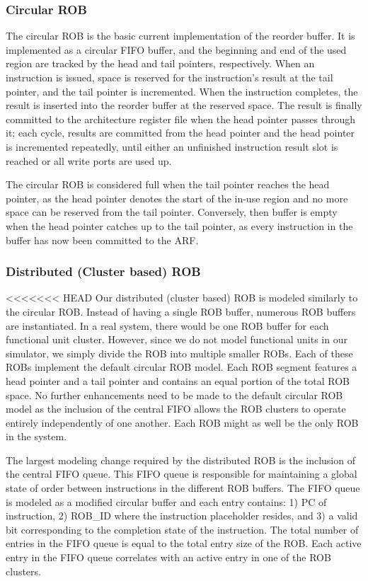 \documentclass{acm_proc_article-sp}
\begin{document}
\subsubsection{Circular ROB}
\label{sec:circ}
The circular ROB is the basic current implementation of the reorder buffer. It is implemented as a circular FIFO buffer, and the beginning and end of the used region are tracked by the head and tail pointers, respectively. When an instruction is issued, space is reserved for the instruction's result at the tail pointer, and the tail pointer is incremented. When the instruction completes, the result is inserted into the reorder buffer at the reserved space. The result is finally committed to the architecture register file when the head pointer passes through it; each cycle, results are committed from the head pointer and the head pointer is incremented repeatedly, until either an unfinished instruction result slot is reached or all write ports are used up.

The circular ROB is considered full when the tail pointer reaches the head pointer, as the head pointer denotes the start of the in-use region and no more space can be reserved from the tail pointer. Conversely, then buffer is empty when the head pointer catches up to the tail pointer, as every instruction in the buffer has now been committed to the ARF.

\subsubsection{Distributed (Cluster based) ROB}
<<<<<<< HEAD
Our distributed (cluster based) ROB is modeled similarly to the circular ROB.  Instead of having a single ROB buffer, 
numerous ROB buffers are instantiated.  In a real system, there would be one ROB buffer for each functional 
unit cluster.  However, since we do not model functional units in our simulator, we simply divide the ROB 
into multiple smaller ROBs.  Each of these ROBs implement the default circular ROB model.  Each ROB segment 
features a head pointer and a tail pointer and contains an equal portion of the total ROB space.  No further 
enhancements need to be made to the default circular ROB model as the inclusion of the central FIFO allows the 
ROB clusters to operate entirely independently of one another.  Each ROB might as well be the only ROB in the system. 

The largest modeling change required by the distributed ROB is the inclusion of the central FIFO queue.  This 
FIFO queue is responsible for maintaining a global state of order between instructions in the different ROB buffers. 
The FIFO queue is modeled as a modified circular buffer and each entry contains: 1) PC of instruction, 
2) ROB_ID where the instruction placeholder resides, and 3) a valid bit corresponding to the completion state of 
the instruction.  The total number of entries in the FIFO queue is equal to the total entry size of the ROB.  
Each active entry in the FIFO queue correlates with an active entry in one of the ROB clusters.  
\end{document}
